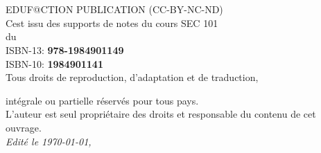 
\newpage

~\vfill
\thispagestyle{empty}

\noindent {\Huge\ccbyncndeu}\\ 

 EDUF@CTION PUBLICATION (CC-BY-NC-ND)\\ %

\noindent C\edoc est issu des supports de notes du cours SEC 101 \\ 
du \uCnam \\

\noindent ISBN-13: \textbf{978-1984901149} \\

\noindent ISBN-10: \textbf{1984901141} \\

\noindent Tous droits de reproduction, d’adaptation et de traduction,

\noindent intégrale ou partielle réservés pour tous pays.\\

\noindent L’auteur est seul propriétaire des droits et responsable du contenu de cet ouvrage.\\

\noindent \textit{Edité le  \today, \printer} %